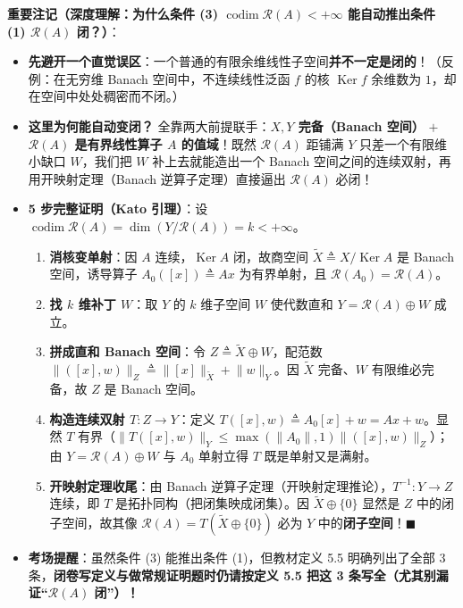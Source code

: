 \documentclass[11pt,a4paper]{article}
\providecommand{\tightlist}{\setlength{\itemsep}{1.8pt}\setlength{\parskip}{0pt}}
\renewenvironment{quote}{%
  \begin{tcolorbox}[
    enhanced,
    breakable,
    colback=AccentSoft!48!white,
    colframe=AccentMain,
    boxrule=0pt,
    leftrule=2.8pt,
    arc=2.5pt,
    left=9pt, right=8pt, top=6pt, bottom=6pt,
    before skip=5.5pt, after skip=5.5pt
  ]\small
}{%
  \end{tcolorbox}%
}
\begin{document}
\begin{quote}
\textbf{重要注记（深度理解：为什么条件 (3) \(\operatorname{codim}\mathcal{R}(A) < +\infty\) 能自动推出条件 (1) \(\mathcal{R}(A)\) 闭？）}：

\begin{itemize}
\tightlist
\item
  \textbf{先避开一个直觉误区}：一个普通的有限余维线性子空间\textbf{并不一定是闭的}！（反例：在无穷维 Banach 空间中，不连续线性泛函 \(f\) 的核 \(\operatorname{Ker} f\) 余维数为 \(1\)，却在空间中处处稠密而不闭。）
\item
  \textbf{这里为何能自动变闭？} 全靠两大前提联手：\textbf{\(X, Y\) 完备（Banach 空间）} \(+\) \textbf{\(\mathcal{R}(A)\) 是有界线性算子 \(A\) 的值域}！既然 \(\mathcal{R}(A)\) 距铺满 \(Y\) 只差一个有限维小缺口 \(W\)，我们把 \(W\) 补上去就能造出一个 Banach 空间之间的连续双射，再用开映射定理（Banach 逆算子定理）直接逼出 \(\mathcal{R}(A)\) 必闭！
\item
  \textbf{5 步完整证明（Kato 引理）}：设 \(\operatorname{codim}\mathcal{R}(A) = \dim(Y/\mathcal{R}(A)) = k < +\infty\)。

  \begin{enumerate}
  \def\labelenumi{\arabic{enumi}.}
  \tightlist
  \item
    \textbf{消核变单射}：因 \(A\) 连续，\(\operatorname{Ker}A\) 闭，故商空间 \(\tilde{X} \triangleq X/\operatorname{Ker}A\) 是 Banach 空间，诱导算子 \(A_0([x]) \triangleq Ax\) 为有界单射，且 \(\mathcal{R}(A_0) = \mathcal{R}(A)\)。
  \item
    \textbf{找 \(k\) 维补丁 \(W\)}：取 \(Y\) 的 \(k\) 维子空间 \(W\) 使代数直和 \(Y = \mathcal{R}(A) \oplus W\) 成立。
  \item
    \textbf{拼成直和 Banach 空间}：令 \(Z \triangleq \tilde{X} \oplus W\)，配范数 \(\lVert([x], w)\rVert_Z \triangleq \lVert[x]\rVert_{\tilde{X}} + \lVert w\rVert_Y\)。因 \(\tilde{X}\) 完备、\(W\) 有限维必完备，故 \(Z\) 是 Banach 空间。
  \item
    \textbf{构造连续双射 \(T: Z \to Y\)}：定义 \(T([x], w) \triangleq A_0[x] + w = Ax + w\)。显然 \(T\) 有界（\(\lVert T([x],w)\rVert_Y \le \max(\lVert A_0\rVert, 1)\lVert([x],w)\rVert_Z\)）；由 \(Y = \mathcal{R}(A) \oplus W\) 与 \(A_0\) 单射立得 \(T\) 既是单射又是满射。
  \item
    \textbf{开映射定理收尾}：由 Banach 逆算子定理（开映射定理推论），\(T^{-1}: Y \to Z\) 连续，即 \(T\) 是拓扑同构（把闭集映成闭集）。因 \(\tilde{X} \oplus \{0\}\) 显然是 \(Z\) 中的闭子空间，故其像 \(\mathcal{R}(A) = T(\tilde{X} \oplus \{0\})\) 必为 \(Y\) 中的\textbf{闭子空间}！\(\blacksquare\)
  \end{enumerate}
\item
  \textbf{考场提醒}：虽然条件 (3) 能推出条件 (1)，但教材定义 5.5 明确列出了全部 3 条，\textbf{闭卷写定义与做常规证明题时仍请按定义 5.5 把这 3 条写全（尤其别漏证``\(\mathcal{R}(A)\) 闭''）！}
\end{itemize}
\end{quote}
\end{document}
